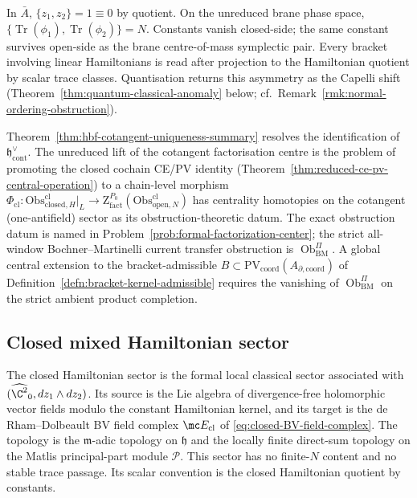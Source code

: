 \documentclass[11pt]{memoir}
\begin{document}
\begin{rmk}\label{rmk:scalar-hamiltonian-center-of-mass}
  In \(\bar A\), \(\{z_1,z_2\}=1\equiv0\) by quotient.  On the
  unreduced brane phase space,
  \(\{\operatorname{Tr}(\phi_1),\operatorname{Tr}(\phi_2)\}=N\).  Constants
  vanish closed-side; the same constant survives open-side as the
  brane centre-of-mass symplectic pair.  Every bracket involving
  linear Hamiltonians is read after projection to the Hamiltonian
  quotient by scalar trace classes.  Quantisation returns this
  asymmetry as the Capelli shift
  (Theorem~\ref{thm:quantum-classical-anomaly} below; cf.\
  Remark~\ref{rmk:normal-ordering-obstruction}).
\end{rmk}

\begin{rmk}\label{rmk:hbf-cotangent-obstruction}
  Theorem~\ref{thm:hbf-cotangent-uniqueness-summary} resolves the
  identification of \(\mathfrak h^\vee_{\mathrm{cont}}\).  The
  unreduced lift of the cotangent factorisation centre is the problem
  of promoting the
  closed cochain CE/PV identity
  (Theorem~\ref{thm:reduced-ce-pv-central-operation}) to a chain-level
  morphism
  \(\Phi_{\mathrm{cl}}\colon
   \mathrm{Obs}^{\mathrm{cl}}_{\mathrm{closed},H}|_L
   \to\mathrm Z^{P_0}_{\mathrm{fact}}(\mathrm{Obs}^{\mathrm{cl}}_{\mathrm{open},N})\)
  has centrality homotopies on the cotangent (one-antifield) sector as
  its obstruction-theoretic datum.
  The exact obstruction datum is named in
  Problem~\ref{prob:formal-factorization-center}; the strict
  all-window Bochner--Martinelli current transfer obstruction is
  \(\operatorname{Ob}^{\Pi}_{\mathrm{BM}}\).  A global central
  extension to the bracket-admissible
  \(B\subset\mathrm{PV}_{\mathrm{coord}}(A_{\partial,\mathrm{coord}})\)
  of Definition~\ref{defn:bracket-kernel-admissible} requires the
  vanishing of \(\operatorname{Ob}^{\Pi}_{\mathrm{BM}}\) on the strict
  ambient product completion.
\end{rmk}

\subsection{Closed mixed Hamiltonian sector}\label{ssec:closed-mixed-hamiltonian}

The closed Hamiltonian sector is the formal local classical sector
associated with \((\widehat{\C^2}_0,dz_1\wedge dz_2)\).  Its source is
the Lie algebra of divergence-free holomorphic vector fields modulo the
constant Hamiltonian kernel, and its target is the de
Rham--Dolbeault BV field complex
\(\mc E_{\mathrm{cl}}\) of
\eqref{eq:closed-BV-field-complex}.  The topology is the
\(\mathfrak m\)-adic topology on \(\mathfrak h\) and the locally finite
direct-sum topology on the Matlis principal-part module
\(\mathcal P\).  This sector has no finite-\(N\) content and no stable
trace passage.  Its scalar convention is the closed Hamiltonian
quotient by constants.
\end{document}
